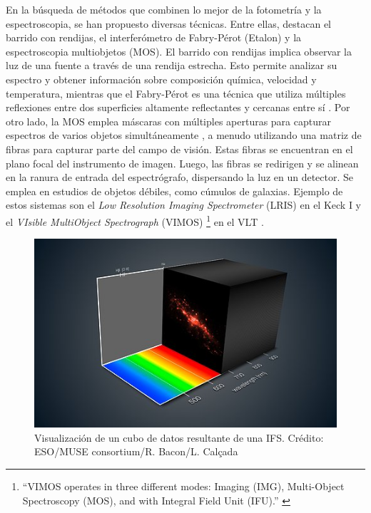 \documentclass[9pt,twocolumn,a4paper]{opticajnl}
\begin{document}
En la búsqueda de métodos que combinen lo mejor de la fotometría y la espectroscopia, se han propuesto diversas técnicas. Entre ellas, destacan el barrido con rendijas, el interferómetro de Fabry-Pérot (Etalon) y la espectroscopia multiobjetos (MOS). El barrido con rendijas implica observar la luz de una fuente a través de una rendija estrecha. Esto permite analizar su espectro y obtener información sobre composición química, velocidad y temperatura, mientras que el Fabry-Pérot es una técnica que utiliza múltiples reflexiones entre dos superficies altamente reflectantes y cercanas entre sí \cite{olmo-nave}. Por otro lado, la MOS emplea máscaras con múltiples aperturas para capturar espectros de varios objetos simultáneamente \cite{oconnell_astr511}, a menudo utilizando una matriz de fibras para capturar parte del campo de visión. Estas fibras se encuentran en el plano focal del instrumento de imagen. Luego, las fibras se redirigen y se alinean en la ranura de entrada del espectrógrafo, dispersando la luz en un detector. Se emplea en estudios de objetos débiles, como cúmulos de galaxias. Ejemplo de estos sistemas son el \textit{Low Resolution Imaging Spectrometer} (LRIS) en el Keck I y el \textit{VIsible MultiObject Spectrograph} (VIMOS) \footnote{“VIMOS operates in three different modes: Imaging (IMG), Multi-Object Spectroscopy (MOS), and with Integral Field Unit (IFU).” \cite{eso_vimos}} en el VLT \cite{oke_1995}.

\begin{figure}
    \centering
    \includegraphics[width=0.8\linewidth]{ifus.jpg}
    \caption{Visualización de un cubo de datos resultante de una IFS. Crédito: ESO/MUSE consortium/R. Bacon/L. Calçada}
    \label{fig:ifus}
\end{figure}
\end{document}
